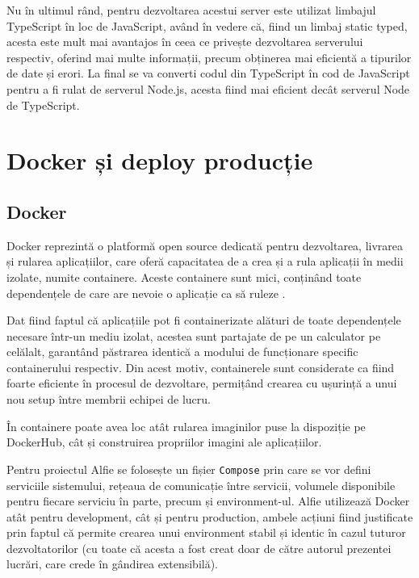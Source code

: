 Nu în ultimul rând, pentru dezvoltarea acestui server este utilizat limbajul TypeScript în loc de JavaScript, având în vedere că, fiind un limbaj static typed, acesta este mult mai avantajos în ceea ce privește dezvoltarea serverului respectiv, oferind mai multe informații, precum obținerea mai eficientă a tipurilor de date și erori. La final se va converti codul din TypeScript în cod de JavaScript pentru a fi rulat de serverul Node.js, acesta fiind mai eficient decât serverul Node de TypeScript.

\section{Docker și deploy producție}

\subsection{Docker}

Docker reprezintă o platformă open source dedicată pentru dezvoltarea, livrarea și rularea aplicațiilor, care oferă capacitatea de a crea și a rula aplicații în medii izolate, numite containere. Aceste containere sunt mici, conținând toate dependențele de care are nevoie o aplicație ca să ruleze \cite{docker}.

Dat fiind faptul că aplicațiile pot fi containerizate alături de toate dependențele necesare într-un mediu izolat, acestea sunt partajate de pe un calculator pe celălalt, garantând păstrarea identică a modului de funcționare specific containerului respectiv. Din acest motiv, containerele sunt considerate ca fiind foarte eficiente în procesul de dezvoltare, permițând crearea cu ușurință a unui nou setup între membrii echipei de lucru.

În containere poate avea loc atât rularea imaginilor puse la dispoziție pe DockerHub, cât și construirea propriilor imagini ale aplicațiilor.

Pentru proiectul Alfie se folosește un fișier \texttt{Compose} prin care se vor defini serviciile sistemului, rețeaua de comunicație între servicii, volumele disponibile pentru fiecare serviciu în parte, precum și environment-ul. Alfie utilizează Docker atât pentru development, cât și pentru production, ambele acțiuni fiind justificate prin faptul că permite crearea unui environment stabil și identic în cazul tuturor dezvoltatorilor (cu toate că acesta a fost creat doar de către autorul prezentei lucrări, care crede în gândirea extensibilă).

